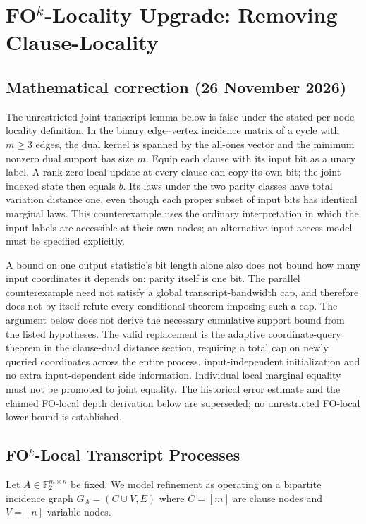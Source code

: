 \section{FO\texorpdfstring{$^k$}{k}-Locality Upgrade: Removing Clause-Locality}


\subsection*{Mathematical correction (26 November 2026)}
The unrestricted joint-transcript lemma below is false under the stated per-node locality definition. In the binary edge--vertex incidence matrix of a cycle with $m\ge3$ edges, the dual kernel is spanned by the all-ones vector and the minimum nonzero dual support has size $m$. Equip each clause with its input bit as a unary label. A rank-zero local update at every clause can copy its own bit; the joint indexed state then equals $b$. Its laws under the two parity classes have total variation distance one, even though each proper subset of input bits has identical marginal laws. This counterexample uses the ordinary interpretation in which the input labels are accessible at their own nodes; an alternative input-access model must be specified explicitly.

A bound on one output statistic's bit length alone also does not bound how many input coordinates it depends on: parity itself is one bit. The parallel counterexample need not satisfy a global transcript-bandwidth cap, and therefore does not by itself refute every conditional theorem imposing such a cap. The argument below does not derive the necessary cumulative support bound from the listed hypotheses. The valid replacement is the adaptive coordinate-query theorem in the clause-dual distance section, requiring a total cap on newly queried coordinates across the entire process, input-independent initialization and no extra input-dependent side information. Individual local marginal equality must not be promoted to joint equality. The historical error estimate and the claimed FO-local depth derivation below are superseded; no unrestricted FO-local lower bound is established.

\subsection{FO\texorpdfstring{$^k$}{k}-Local Transcript Processes}

Let $A \in \mathbb{F}_2^{m\times n}$ be fixed.
We model refinement as operating on a bipartite incidence graph
$G_A = (C \cup V, E)$ where $C=[m]$ are clause nodes
and $V=[n]$ variable nodes.


